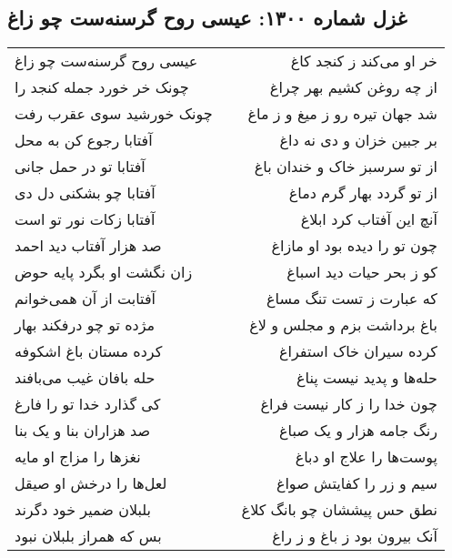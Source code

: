 \begin{center}
\section*{غزل شماره ۱۳۰۰: عیسی روح گرسنه‌ست چو زاغ}
\label{sec:1300}
\begin{longtable}{l p{0.5cm} r}
عیسی روح گرسنه‌ست چو زاغ
&&
خر او می‌کند ز کنجد کاغ
\\
چونک خر خورد جمله کنجد را
&&
از چه روغن کشیم بهر چراغ
\\
چونک خورشید سوی عقرب رفت
&&
شد جهان تیره رو ز میغ و ز ماغ
\\
آفتابا رجوع کن به محل
&&
بر جبین خزان و دی نه داغ
\\
آفتابا تو در حمل جانی
&&
از تو سرسبز خاک و خندان باغ
\\
آفتابا چو بشکنی دل دی
&&
از تو گردد بهار گرم دماغ
\\
آفتابا زکات نور تو است
&&
آنچ این آفتاب کرد ابلاغ
\\
صد هزار آفتاب دید احمد
&&
چون تو را دیده بود او مازاغ
\\
زان نگشت او بگرد پایه حوض
&&
کو ز بحر حیات دید اسباغ
\\
آفتابت از آن همی‌خوانم
&&
که عبارت ز تست تنگ مساغ
\\
مژده تو چو درفکند بهار
&&
باغ برداشت بزم و مجلس و لاغ
\\
کرده مستان باغ اشکوفه
&&
کرده سیران خاک استفراغ
\\
حله بافان غیب می‌بافند
&&
حله‌ها و پدید نیست پناغ
\\
کی گذارد خدا تو را فارغ
&&
چون خدا را ز کار نیست فراغ
\\
صد هزاران بنا و یک بنا
&&
رنگ جامه هزار و یک صباغ
\\
نغزها را مزاج او مایه
&&
پوست‌ها را علاج او دباغ
\\
لعل‌ها را درخش او صیقل
&&
سیم و زر را کفایتش صواغ
\\
بلبلان ضمیر خود دگرند
&&
نطق حس پیششان چو بانگ کلاغ
\\
بس که همراز بلبلان نبود
&&
آنک بیرون بود ز باغ و ز راغ
\\
\end{longtable}
\end{center}
